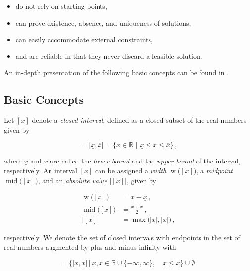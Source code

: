\begin{itemize}
	\item do not rely on starting points,
	\item can prove existence, absence, and uniqueness of solutions,
	\item can easily accommodate external constraints,
	\item and are reliable in that they never discard a feasible solution.
\end{itemize}

\noindent
An in-depth presentation of the following basic concepts can be found in \cite{jaulin2001applied}.


\subsection{Basic Concepts}
\label{sec: interval_basic_concepts}

Let $[x]$ denote a \emph{closed interval}, defined as a closed subset of the real numbers given by

\begin{equation}
  [x] = \big[\underline{x}, \overline{x}\big] = \big\{x \in \mathbb{R} \,\,|\,\, \underline{x} \leq x \leq \overline{x}\big\}\,,
\end{equation}

\noindent
 where $\underline{x}$ and $\overline{x}$ are called the \emph{lower bound} and the \emph{upper bound} of the interval, respectively. An interval $[x]$ can be assigned a \emph{width} $\operatorname{w}\big([x]\big)$, a \emph{midpoint} $\operatorname{mid}\big([x]\big)$, and an \emph{absolute value} $\big|[x]\big|$, given by

\begin{align}
\operatorname{w}\big([x]\big) &= \overline{x} - \underline{x}\,, \\
\operatorname{mid}\big([x]\big) &= \frac{\underline{x} + \overline{x}}{2}\,, \\
\big|[x]\big| &= \max\big(|\underline{x}|, |\overline{x}|\big) \,,
\end{align}


\noindent
respectively. We denote the set of closed intervals with endpoints in the set of real numbers augmented by plus and minus infinity with
 
 \begin{equation}
 [\mathbb{R}] = \Big\{\big[\underline{x}, \overline{x}\big] \,|\: \underline{x}, \overline{x} \in \mathbb{R} \cup \{-\infty, \infty\}, \quad \underline{x} \leq \overline{x}\Big\} \cup \emptyset \,.
 \end{equation} 
 
